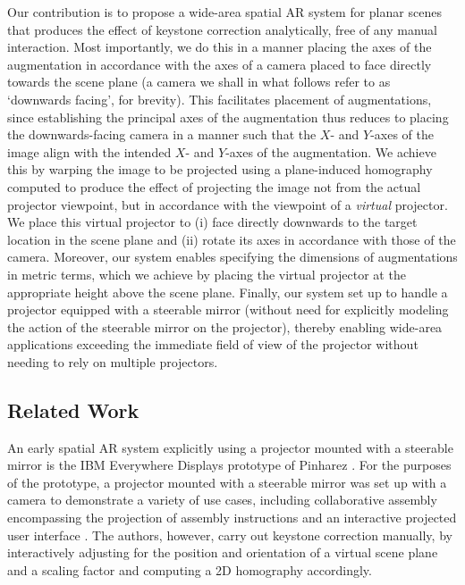 \documentclass[review]{elsarticle}
\begin{document}
Our contribution is to propose a wide-area spatial AR system for planar scenes that produces the effect of keystone correction analytically, free of any manual interaction. Most importantly, we do this in a manner placing the axes of the augmentation in accordance with the axes of a camera placed to face directly towards the scene plane (a camera we shall in what follows refer to as `downwards facing', for brevity). This facilitates placement of augmentations, since establishing the principal axes of the augmentation thus reduces to placing the downwards-facing camera in a manner such that the $X$- and $Y$-axes of the image align with the intended $X$- and $Y$-axes of the augmentation. We achieve this by warping the image to be projected using a plane-induced homography computed to produce the effect of projecting the image not from the actual projector viewpoint, but in accordance with the viewpoint of a \textit{virtual} projector. We place this virtual projector to (i) face directly downwards to the target location in the scene plane and (ii) rotate its axes in accordance with those of the camera. Moreover, our system enables specifying the dimensions of augmentations in metric terms, which we achieve by placing the virtual projector at the appropriate height above the scene plane. Finally, our system set up to handle a projector equipped with a steerable mirror (without need for explicitly modeling the action of the steerable mirror on the projector), thereby enabling wide-area applications exceeding the immediate field of view of the projector without needing to rely on multiple projectors.

\subsection{Related Work}

An early spatial AR system explicitly using a projector mounted with a steerable mirror is the IBM Everywhere Displays prototype of Pinharez \cite{pinhanez2001everywhere}. For the purposes of the prototype, a projector mounted with a steerable mirror was set up with a camera to demonstrate a variety of use cases, including collaborative assembly encompassing the projection of assembly instructions and an interactive projected user interface \cite{kjeldsen2002interacting,pinhanez2003applications}. The authors, however, carry out keystone correction manually, by interactively adjusting for the position and orientation of a virtual scene plane and a scaling factor and computing a 2D homography accordingly. %
\end{document}
